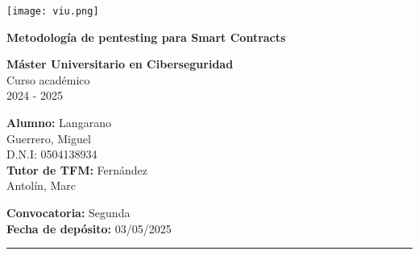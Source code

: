 \documentclass[11pt,a4paper,twoside]{report}
\begin{document}
\singlespacing
\RaggedRight

\begin{titlepage}
\begin{center}

\texttt{[image: viu.png]}

\vspace{5cm}

\parbox{0.8\textwidth}{
    \centering
    \Large\textbf{Metodología de pentesting para Smart Contracts} \\
}

\vspace{8cm} %

\end{center}

\noindent %
\begin{tcbraster}[raster columns=3, raster equal height=rows, raster column skip=10pt] %
    \begin{footerbox} %
        \textbf{Máster Universitario en Ciberseguridad} \\
        Curso académico \\
        2024 - 2025
    \end{footerbox}
    \begin{footerbox} %
        \textbf{Alumno:} Langarano \\
        Guerrero, Miguel \\
        D.N.I: 0504138934 \\[1ex] %
        \textbf{Tutor de TFM:} Fernández \\
        Antolín, Marc
    \end{footerbox}
    \begin{footerbox} %
        \textbf{Convocatoria:} Segunda \\[4ex] %
        \textbf{Fecha de depósito:} 03/05/2025
    \end{footerbox}
\end{tcbraster} %

\vspace{2mm} %

\noindent %
{\color{lightgray}\rule{\linewidth}{4pt}} %


\end{titlepage}
\end{document}
